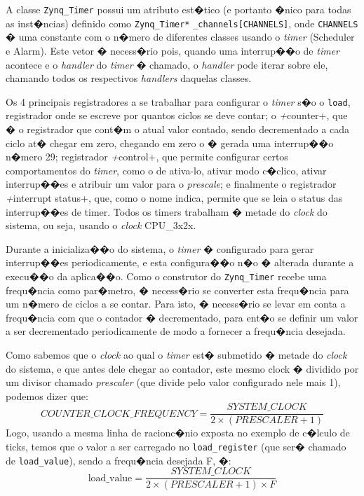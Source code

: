 \documentclass{ufscThesis/ufscThesis} %
\begin{document}
A classe \verb+Zynq_Timer+ possui um atributo est�tico (e portanto �nico para todas as inst�ncias) definido como \verb+Zynq_Timer*+ \verb+_channels[CHANNELS]+, onde \verb+CHANNELS+ � uma constante com o n�mero de diferentes classes usando o \emph{timer} (Scheduler e Alarm). Este vetor � necess�rio pois, quando uma interrup��o de \emph{timer} acontece e o \emph{handler} do \emph{timer} � chamado, o \emph{handler} pode iterar sobre ele, chamando todos os respectivos \emph{handlers} daquelas classes.


Os 4 principais registradores a se trabalhar para configurar o \emph{timer} s�o o \verb+load+, registrador onde se escreve por quantos ciclos se deve contar; o \emph+counter+, que � o registrador que cont�m o atual valor contado, sendo decrementado a cada ciclo at� chegar em zero, chegando em zero o � gerada uma interrup��o n�mero 29; registrador \emph+control+, que permite configurar certos comportamentos do \emph{timer}, como o de ativa-lo, ativar modo c�clico, ativar interrup��es e atribuir um valor para o \emph{prescale}; e finalmente o registrador \emph+interrupt status+, que, como o nome indica, permite que se leia o status das interrup��es de timer. Todos os timers trabalham � metade do \emph{clock} do sistema, ou seja, usando o \emph{clock} CPU\_3x2x.

Durante a inicializa��o do sistema, o \emph{timer} � configurado para gerar interrup��es periodicamente, e esta configura��o n�o � alterada durante a execu��o da aplica��o. Como o construtor do \verb+Zynq_Timer+ recebe uma frequ�ncia como par�metro, � necess�rio se converter esta frequ�ncia para um n�mero de ciclos a se contar. Para isto, � necess�rio se levar em conta a frequ�ncia com que o contador � decrementado, para ent�o se definir um valor a ser decrementado periodicamente de modo a fornecer a frequ�ncia desejada.

Como sabemos que o \emph{clock} ao qual o \emph{timer} est� submetido � metade do \emph{clock} do sistema, e que antes dele chegar ao contador, este mesmo clock � dividido por um divisor chamado \emph{prescaler} (que divide pelo valor configurado nele mais 1), podemos dizer que:
\[
	COUNTER\_CLOCK\_FREQUENCY = \frac{SYSTEM\_CLOCK}{2 \times (PRESCALER+1)}
\]
Logo, usando a mesma linha de racionc�nio exposta no exemplo de c�lculo de ticks, temos que o valor a ser carregado no \verb+load_register+ (que ser� chamado de \verb+load_value+), sendo a frequ�ncia desejada F, �:
\begin{equation}
	\text{load\_value} = \frac{SYSTEM\_CLOCK}{2 \times (PRESCALER+1) \times F}
\end{equation}
\end{document}
